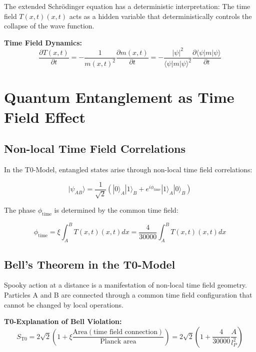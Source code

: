 \documentclass[12pt,a4paper]{report}
\newcommand{\Tfield}{T(x,t)}  %
\newcommand{\mfield}{m(x,t)}  %
\newcommand{\xipar}{\xi}      %
\begin{document}
	The extended Schrödinger equation has a deterministic interpretation: The time field $\Tfield(x,t)$ acts as a hidden variable that deterministically controls the collapse of the wave function.
	
	\textbf{Time Field Dynamics:}
	\begin{equation}\label{eq:timefield_dynamics}
		\frac{\partial \Tfield}{\partial t} = -\frac{1}{\mfield^2} \frac{\partial \mfield}{\partial t} = -\frac{|\psi|^2}{\langle \psi | m | \psi \rangle^2} \frac{\partial \langle \psi | m | \psi \rangle}{\partial t}
	\end{equation}
	
	\section{Quantum Entanglement as Time Field Effect}\label{sec:quantum_entanglement}
	
	\subsection{Non-local Time Field Correlations}\label{subsec:nonlocal_correlations}
	
	In the T0-Model, entangled states arise through non-local time field correlations:
	
	\begin{equation}\label{eq:entangled_state}
		|\psi_{AB}\rangle = \frac{1}{\sqrt{2}} \left(|0\rangle_A |1\rangle_B + e^{i\phi_{\text{time}}} |1\rangle_A |0\rangle_B\right)
	\end{equation}
	
	The phase $\phi_{\text{time}}$ is determined by the common time field:
	
	\begin{equation}\label{eq:timefield_phase}
		\phi_{\text{time}} = \xipar \int_A^B \Tfield(x,t) dx = \frac{4}{30000} \int_A^B \Tfield(x,t) dx
	\end{equation}
	
	\subsection{Bell's Theorem in the T0-Model}\label{subsec:bell_theorem_t0}
	
	Spooky action at a distance is a manifestation of non-local time field geometry. Particles A and B are connected through a common time field configuration that cannot be changed by local operations.
	
	\textbf{T0-Explanation of Bell Violation:}
	\begin{equation}\label{eq:bell_t0}
		S_{\text{T0}} = 2\sqrt{2} \left(1 + \xipar \frac{\text{Area}(\text{time field connection})}{\text{Planck area}}\right) = 2\sqrt{2} \left(1 + \frac{4}{30000} \frac{A}{l_P^2}\right)
	\end{equation}
	
\end{document}
